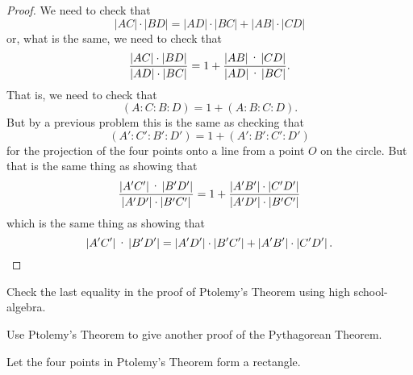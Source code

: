 \documentclass{ximera}
\begin{document}
\begin{proof}
We need to check that%
\[
\left\vert AC\right\vert \cdot\left\vert BD\right\vert
=\left\vert AD\right\vert \cdot\left\vert BC\right\vert
+\left\vert AB\right\vert \cdot\left\vert CD\right\vert
\]
or, what is the same, we need to check that%
\[
\frac{\left\vert AC\right\vert \cdot\left\vert
BD\right\vert }{\left\vert AD\right\vert \cdot\left\vert
BC\right\vert }=1+\frac{\left\vert AB\right\vert \text{\textperiodcentered
}\left\vert CD\right\vert }{\left\vert AD\right\vert \text{\textperiodcentered
}\left\vert BC\right\vert }.
\]
That is, we need to check that
\[
\left(  A:C:B:D\right)  =1+\left(  A:B:C:D\right)  .
\]
But by a previous problem this is the same as checking that%
\[
\left(  A':C':B':D'\right)  =1+\left(
A':B':C':D'\right)
\]
for the projection of the four points onto a line from a point $O$ on the
circle. But that is the same thing as showing that
\[
\frac{\left\vert A'C'\right\vert \text{\textperiodcentered
}\left\vert B'D'\right\vert }{\left\vert A'D^{\prime
}\right\vert \cdot\left\vert B'C^{\prime
}\right\vert }=1+\frac{\left\vert A'B'\right\vert
\cdot\left\vert C'D'\right\vert
}{\left\vert A'D'\right\vert \cdot \left\vert B'C'\right\vert }%
\]
which is the same thing as showing that%
\[
\left\vert A'C'\right\vert \text{\textperiodcentered
}\left\vert B'D'\right\vert =\left\vert A'D^{\prime
}\right\vert \cdot\left\vert B'C^{\prime
}\right\vert +\left\vert A'B'\right\vert
\cdot\left\vert C'D'\right\vert .
\]
\end{proof}


\begin{problem}
Check the last equality in the proof of Ptolemy's Theorem using high
school-algebra.
\begin{freeResponse}
\end{freeResponse}
\end{problem}

\begin{problem}
Use Ptolemy's Theorem to give another proof of the Pythagorean Theorem.
\begin{hint}
Let the four points in Ptolemy's Theorem form a rectangle.
\end{hint}
\begin{freeResponse}
\end{freeResponse}
\end{problem}
\end{document}
